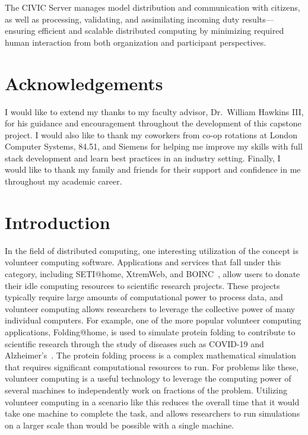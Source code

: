 \documentclass[11pt]{article}
\begin{document}
The CIVIC Server manages model distribution and communication with citizens, as well as processing, validating, and assimilating incoming duty results---ensuring efficient and scalable distributed computing by minimizing required human interaction from both organization and participant perspectives.

\section*{Acknowledgements}

I would like to extend my thanks to my faculty advisor, Dr.\ William Hawkins III, for his guidance and encouragement throughout the development of this capstone project. I would also like to thank my coworkers from co-op rotations at London Computer Systems, 84.51\degree, and Siemens for helping me improve my skills with full stack development and learn best practices in an industry setting. Finally, I would like to thank my family and friends for their support and confidence in me throughout my academic career.

\section{Introduction}

In the field of distributed computing, one interesting utilization of the concept is volunteer computing software. Applications and services that fall under this category, including SETI@home, XtremWeb, and BOINC~\cite{Mengistu2020}, allow users to donate their idle computing resources to scientific research projects. These projects typically require large amounts of computational power to process data, and volunteer computing allows researchers to leverage the collective power of many individual computers. For example, one of the more popular volunteer computing applications, Folding@home, is used to simulate protein folding to contribute to scientific research through the study of diseases such as COVID-19 and Alzheimer's~\cite{Voelz2023}. The protein folding process is a complex mathematical simulation that requires significant computational resources to run. For problems like these, volunteer computing is a useful technology to leverage the computing power of several machines to independently work on fractions of the problem. Utilizing volunteer computing in a scenario like this reduces the overall time that it would take one machine to complete the task, and allows researchers to run simulations on a larger scale than would be possible with a single machine.
\end{document}
